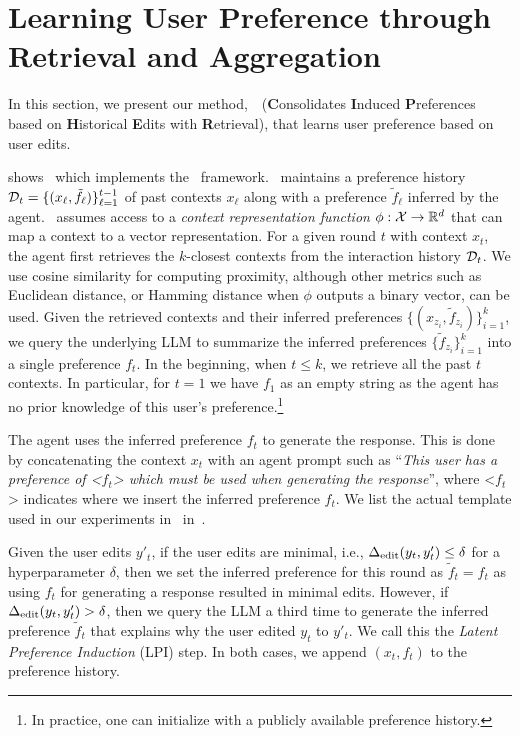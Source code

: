 \section{Learning User Preference through Retrieval and Aggregation}

In this section, we present our method,~\algname~(\textbf{C}onsolidates \textbf{I}nduced \textbf{P}references based on \textbf{H}istorical \textbf{E}dits with \textbf{R}etrieval), that learns user preference based on user edits.

 shows \algname~which implements the \framework~framework. \algname~maintains a preference history $\mathcal{D}_t = \{(x_\ell, \tilde{f}_\ell)\}_{\ell=1}^{t-1}$ of past contexts $x_\ell$ along with a preference $\tilde{f}_\ell$ inferred by the agent. \algname~assumes access to a \emph{context representation function} $\phi:\mathcal{X} \rightarrow \mathbb{R}^d$ that can map a context to a vector representation. For a given round $t$ with context $x_t$, the agent first retrieves the $k$-closest contexts from the interaction history $\mathcal{D}_t$. We use cosine similarity for computing proximity, although other metrics such as Euclidean distance, or Hamming distance when $\phi$ outputs a binary vector, can be used. Given the retrieved contexts and their inferred preferences $\{(x_{z_i}, \tilde{f}_{z_i})\}_{i=1}^k$, we query the underlying LLM to summarize the inferred preferences $\{\tilde{f}_{z_i}\}_{i=1}^k$ into a single preference $f_t$. In the beginning, when $t \le k$, we retrieve all the past $t$ contexts. In particular, for $t=1$ we have $f_1$ as an empty string as the agent has no prior knowledge of this user's preference.\footnote{In practice, one can initialize with a publicly available preference history.}

The agent uses the inferred preference $f_t$ to generate the response. This is done by concatenating the context $x_t$ with an agent prompt such as ``\emph{This user has a preference of <$f_t$> which must be used when generating the response}'', where <$f_t$> indicates where we insert the inferred preference $f_t$. We list the actual template used in our experiments in~ in~.

Given the user edits $y'_t$, if the user edits are minimal, i.e., $\Delta_{\textrm{edit}}(y_t, y'_t) \le \delta$ for a hyperparameter $\delta$, then we 
set the inferred preference for this round as $\tilde{f}_t = f_t$
 as using $f_t$ for generating a response resulted in minimal edits. However, if $\Delta_{\textrm{edit}}(y_t, y'_t) > \delta$, then we query the LLM a third time to generate the inferred preference $\tilde{f}_t$ that explains why the user edited $y_t$ to $y'_t$.  We call this the \emph{Latent Preference Induction} (LPI) step. In both cases, we append $(x_t, f_t)$ to the preference history.
 
